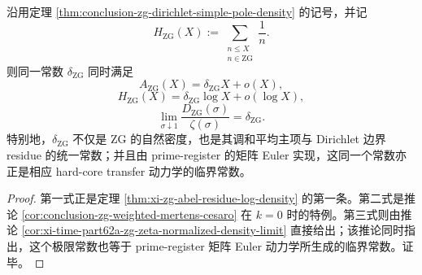 \begin{theorem}\label{thm:conclusion-zg-harmonic-tauberian-triple-constant}
沿用定理 \ref{thm:conclusion-zg-dirichlet-simple-pole-density} 的记号，并记
\[
H_{\mathrm{ZG}}(X):=\sum_{\substack{n\le X\\ n\in \mathrm{ZG}}}\frac1n.
\]
则同一常数 \(\delta_{\mathrm{ZG}}\) 同时满足
\[
A_{\mathrm{ZG}}(X)=\delta_{\mathrm{ZG}}X+o(X),
\]
\[
H_{\mathrm{ZG}}(X)=\delta_{\mathrm{ZG}}\log X+o(\log X),
\]
\[
\lim_{\sigma\downarrow 1}\frac{D_{\mathrm{ZG}}(\sigma)}{\zeta(\sigma)}=\delta_{\mathrm{ZG}}.
\]
特别地，\(\delta_{\mathrm{ZG}}\) 不仅是 \(\mathrm{ZG}\) 的自然密度，也是其调和平均主项与 Dirichlet 边界 residue 的统一常数；并且由 prime-register 的矩阵 Euler 实现，这同一个常数亦正是相应 hard-core transfer 动力学的临界常数。
\end{theorem}

\begin{proof}
第一式正是定理 \ref{thm:xi-zg-abel-residue-log-density} 的第一条。第二式是推论 \ref{cor:conclusion-zg-weighted-mertens-cesaro} 在 \(k=0\) 时的特例。第三式则由推论 \ref{cor:xi-time-part62a-zg-zeta-normalized-density-limit} 直接给出；该推论同时指出，这个极限常数也等于 prime-register 矩阵 Euler 动力学所生成的临界常数。证毕。
\end{proof}

